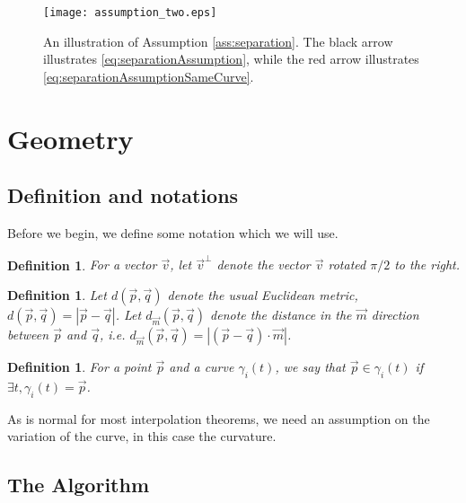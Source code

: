 \documentclass{article}
\newtheorem{definition}[cntr]{Definition}
\numberwithin{cntr}{section}
\numberwithin{equation}{section}
\newcommand{\abs}[1]{\left| #1 \right|}%
\newcommand{\vp}[0]{{\vec{p}}}
\newcommand{\vq}[0]{{\vec{q}}}
\newcommand{\vm}[0]{{\vec{m}}}
\newcommand{\vv}[0]{{\vec{v}}}
\begin{document}
\begin{figure}
\setlength{\unitlength}{0.240900pt}
\ifx\plotpoint\undefined\newsavebox{\plotpoint}\fi
\sbox{\plotpoint}{\rule[-0.200pt]{0.400pt}{0.400pt}}%
\texttt{[image: assumption\_two.eps]}

\caption{An illustration of Assumption \ref{ass:separation}. The black arrow illustrates \eqref{eq:separationAssumption}, while the red arrow illustrates \eqref{eq:separationAssumptionSameCurve}.}
\label{fig:separationBetweenCurves}
\end{figure}

\section{Geometry}
\subsection{Definition and notations}
Before we begin, we define some notation which we will use.

\begin{definition}
  \label{def:perp}
  For a vector $\vv$, let $\vv^{\perp}$ denote the vector $\vv$ rotated $\pi/2$ to the right.
\end{definition}

\begin{definition}
  \label{def:metric}
  Let $d(\vp,\vq)$ denote the usual Euclidean metric, $d(\vp,\vq) = \abs{\vp - \vq}$. Let $d_{\vm}(\vp,\vq)$ denote the distance in the $\vm$ direction between $\vp$ and $\vq$, i.e. $d_{\vm}(\vp,\vq) = \abs{ (\vp - \vq) \cdot \vm}$.
\end{definition}

\begin{definition}
  For a point $\vp$ and a curve $\gamma_{i}(t)$, we say that $\vp \in \gamma_{i}(t)$ if $\exists t, \gamma_{i}(t)=\vp$.
\end{definition}

As is normal for most interpolation theorems, we need an assumption on the variation of the curve, in this case the curvature.

\subsection{The Algorithm}
\end{document}
